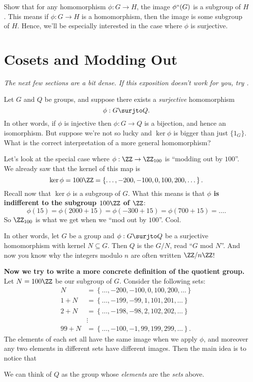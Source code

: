 \begin{ques}
	Show that for any homomorphism $\phi: G \to H$,
	the image $\phi``(G)$ is a subgroup of $H$.
	This means if $\phi : G \to H$ is a homomorphism, then the image is some subgroup of $H$.
	Hence, we'll be especially interested in the case where $\phi$ is surjective.
\end{ques}

\section{Cosets and Modding Out}
\emph{The next few sections are a bit dense.
If this exposition doesn't work for you, try \cite{ref:gowers}.}

Let $G$ and $Q$ be groups, and suppose there exists
a \emph{surjective} homomorphism \[ \phi : G \surjto Q. \]
In other words, if $\phi$ is injective then $\phi : G \to Q$ is a bijection, and hence an isomorphism.
But suppose we're not so lucky and $\ker\phi$ is bigger than just $\{1_G\}$.
What is the correct interpretation of a more general homomorphism?

Let's look at the special case where $\phi : \ZZ \to \Zc{100}$ is ``modding out by $100$''.
We already saw that the kernel of this map is
\[ 
	\ker \phi = 100\ZZ = \left\{ \dots, -200, -100, 0, 100, 200, \dots  \right\}.
\]
Recall now that $\ker \phi$ is a subgroup of $G$.
What this means is that \textbf{$\phi$ is indifferent to the subgroup $100\ZZ$ of $\ZZ$}:
\[ \phi(15) = \phi(2000 + 15) = \phi(-300 + 15) = \phi(700 + 15) = \dots. \]
So $\Zc{100}$ is what we get when we ``mod out by $100$''. Cool.

In other words, let $G$ be a group and $\phi : G \surjto Q$
be a surjective homomorphism with kernel $N \subseteq G$.
Then $Q$ is the  $G/N$, read ``$G$ mod $N$''.
And now you know why the integers modulo $n$ are often written $\ZZ/n\ZZ$!

\textbf{Now we try to write a more concrete definition of the quotient group.}
Let $N = 100\ZZ$ be our subgroup of $G$.
Consider the following sets:
\begin{align*}
	N &= \left\{ \dots, -200, -100, 0, 100, 200, \dots \right\} \\
	1+N &= \left\{ \dots, -199, -99, 1, 101, 201, \dots \right\} \\
	2+N &= \left\{ \dots, -198, -98, 2, 102, 202, \dots \right\} \\
	&\vdots \\
	99+N &= \left\{ \dots, -100, -1, 99, 199, 299, \dots \right\}.
\end{align*}
The elements of each set all have the same image when we apply $\phi$,
and moreover any two elements in different sets have different images.
Then the main idea is to notice that
\begin{moral}
	We can think of $Q$ as the group
	whose \emph{elements} are the \emph{sets} above.
\end{moral}

